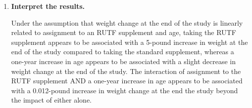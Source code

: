 \documentclass{article}\usepackage[]{graphicx}\usepackage[]{xcolor}
\begin{document}
\begin{enumerate}[label=\textbf{\arabic*.}]
  \item \textbf{Interpret the results.}
  
  Under the assumption that weight change at the end of the study is linearly related to assignment to an RUTF supplement and age, taking the RUTF supplement appears to be associated with a 5-pound increase in weight at the end of the study compared to taking the standard supplement, whereas a one-year increase in age appears to be associated with a slight decrease in weight change at the end of the study. The interaction of assignment to the RUTF supplement AND a one-year increase in age appears to be associated with a 0.012-pound increase in weight change at the end the study beyond the impact of either alone.
  


\end{enumerate}
      
\end{document}
